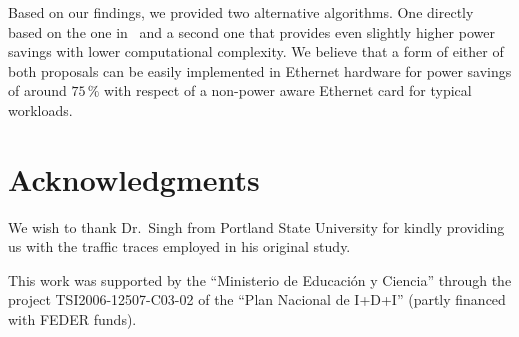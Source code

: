 \documentclass[conference,english]{IEEEtran}
\begin{document}
Based on our findings, we provided two alternative algorithms. One directly
based on the one in~\cite{gupta07:_using_low_power_modes_for} and a second one
that provides even slightly higher power savings with lower computational
complexity. We believe that a form of either of both proposals can be easily
implemented in Ethernet hardware for power savings of around $75\,\%$ with
respect of a non-power aware Ethernet card for typical workloads.

\section*{Acknowledgments}
\label{sec:acknowlgedgments}

We wish to thank Dr.~Singh from Portland State University for kindly providing
us with the traffic traces employed in his original study.

This work was supported by the ``Ministerio de Educación y Ciencia'' through
the project TSI2006-12507-C03-02 of the ``Plan Nacional de I+D+I'' (partly
financed with FEDER funds).

\balance{}



\end{document}
